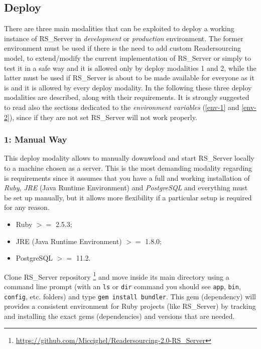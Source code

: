 \documentclass[a4paper, english]{article}
\newcounter{subsubsubsection}[subsubsection]
\begin{document}
\subsection{Deploy}

There are three main modalities that can be exploited to deploy a working instance of RS\_Server in \emph{development} or \emph{production} environment. The former environment must be used if there is the need to add custom Readersourcing model, to extend/modify the current implementation of RS\_Server or simply to test it in a safe way and it is allowed only by deploy modalities 1 and 2, while the latter must be used if RS\_Server is about to be made available for everyone as it is and it is allowed by every deploy modality. In the following these three deploy modalities are described, along with their requirements. It is strongly suggested to read also the sections dedicated to the \emph{environment variables} (\ref{env-1} and \ref{env-2}), since if they are not set RS\_Server will not work properly.

\subsubsection{1: Manual Way}

\label{deploy1}

This deploy modality allows to manually downwload and start RS\_Server locally to a machine chosen as a server. This is the most demanding modality regarding is requirements since it assumes that you have a full and working installation of \emph{Ruby}, \emph{JRE} (Java Runtime Environment) and \emph{PostgreSQL} and everything must be set up manually, but it allows more flexibility if a particular setup is required for any reason. 


\begin{itemize}
\item Ruby $>=$ 2.5.3;
\item JRE (Java Runtime Environment) $>=$ 1.8.0;
\item PostgreSQL $>=$ 11.2.
\end{itemize}


Clone RS\_Server repository \footnote{\url{https://github.com/Miccighel/Readersourcing-2.0-RS_Server}} and move inside its main directory using a command line prompt (with an \verb|ls| or \verb|dir| command you should see \verb|app|, \verb|bin|, \verb|config|, etc. folders) and type \verb|gem install bundler|. This gem (dependency) will provides a consistent environment for Ruby projects (like RS\_Server) by tracking and installing the exact gems (dependencies) and versions that are needed. 
\end{document}
